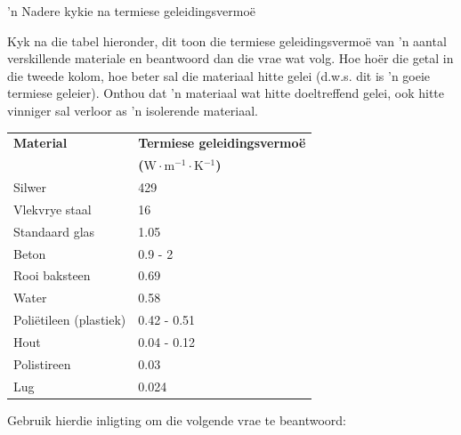             \begin{Investigation}{'n Nadere kykie na termiese geleidingsvermo\"e}
{            \nopagebreak
      \label{m38706*id66744}      Kyk na die tabel hieronder, dit toon die termiese geleidingsvermo\"e van 'n aantal verskillende materiale en beantwoord dan die vrae wat volg. Hoe ho\"er die getal in die tweede kolom, hoe beter sal die materiaal hitte gelei (d.w.s. dit is 'n goeie termiese geleier). Onthou dat 'n materiaal wat hitte doeltreffend gelei, ook hitte vinniger sal verloor as 'n isolerende materiaal.\par 
          \begin{table}[H]
        \begin{center}
      \label{m38706*id66753}
    \noindent
      \begin{tabular}{|l|l|}\hline
\textbf{Material} & \textbf{Termiese geleidingsvermoë} \\ 
                 &  \textbf{($\text{W}\ensuremath{\cdot}\text{m}{}^{-1}\ensuremath{\cdot}\text{K}{}^{-1}$) } \\ \hline
Silwer & 429 \\ \hline
Vlekvrye staal & 16 \\ \hline
Standaard glas & 1.05 \\ \hline
Beton & 0.9 - 2 \\ \hline
Rooi baksteen & 0.69 \\ \hline
Water & 0.58 \\ \hline
Poli\"etileen (plastiek) & 0.42 - 0.51 \\ \hline
Hout & 0.04 - 0.12 \\ \hline
Polistireen & 0.03 \\ \hline
Lug & 0.024 \\ \hline
    \end{tabular}
      \end{center}
\end{table}
    \par
      \label{m38706*id67009}Gebruik hierdie inligting om die volgende vrae te beantwoord:\par 
}
\end{Investigation}
